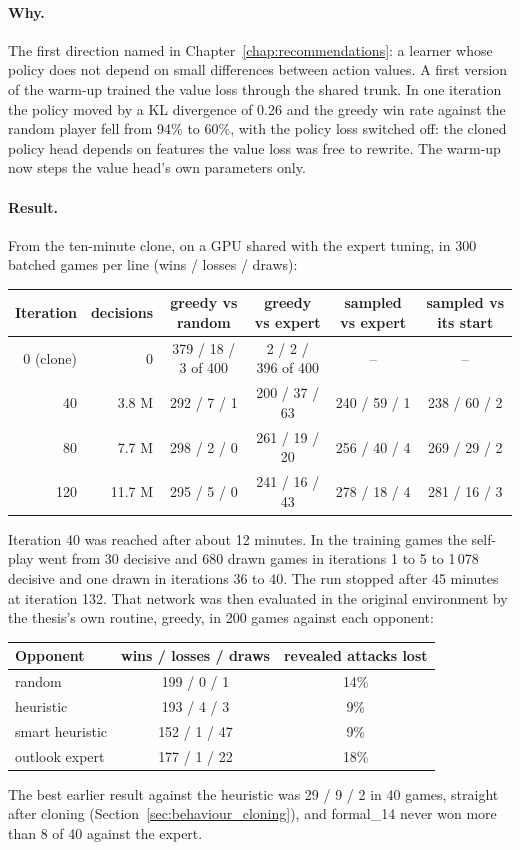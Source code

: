 \paragraph{Why.} The first direction named in Chapter~\ref{chap:recommendations}: a learner whose
policy does not depend on small differences between action values. A first version of the warm-up
trained the value loss through the shared trunk. In one iteration the policy moved by a KL
divergence of 0.26 and the greedy win rate against the random player fell from 94\% to 60\%, with
the policy loss switched off: the cloned policy head depends on features the value loss was free
to rewrite. The warm-up now steps the value head's own parameters only.

\paragraph{Result.} From the ten-minute clone, on a GPU shared with the expert tuning, in 300
batched games per line (wins / losses / draws):
\begin{center}
\small
\begin{tabular}{rrcccc}
\toprule
Iteration & decisions & greedy vs random & greedy vs expert & sampled vs expert & sampled vs its start \\
\midrule
0 (clone) & 0 & 379 / 18 / 3 of 400 & 2 / 2 / 396 of 400 & -- & -- \\
40  & 3.8 M  & 292 / 7 / 1 & 200 / 37 / 63 & 240 / 59 / 1 & 238 / 60 / 2 \\
80  & 7.7 M  & 298 / 2 / 0 & 261 / 19 / 20 & 256 / 40 / 4 & 269 / 29 / 2 \\
120 & 11.7 M & 295 / 5 / 0 & 241 / 16 / 43 & 278 / 18 / 4 & 281 / 16 / 3 \\
\bottomrule
\end{tabular}
\end{center}
Iteration 40 was reached after about 12 minutes. In the training games the self-play went from 30
decisive and 680 drawn games in iterations 1 to 5 to 1\,078 decisive and one drawn in iterations
36 to 40. The run stopped after 45 minutes at iteration 132. That network was then evaluated in
the original environment by the thesis's own routine, greedy, in 200 games against each opponent:
\begin{center}
\small
\begin{tabular}{lcc}
\toprule
Opponent & wins / losses / draws & revealed attacks lost \\
\midrule
random          & 199 / 0 / 1  & 14\% \\
heuristic       & 193 / 4 / 3  & 9\% \\
smart heuristic & 152 / 1 / 47 & 9\% \\
outlook expert  & 177 / 1 / 22 & 18\% \\
\bottomrule
\end{tabular}
\end{center}
The best earlier result against the heuristic was 29 / 9 / 2 in 40 games, straight after cloning
(Section~\ref{sec:behaviour_cloning}), and formal\_14 never won more than 8 of 40 against the
expert.

